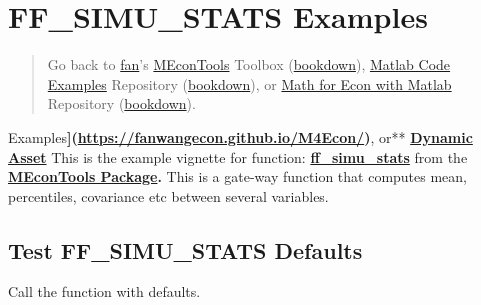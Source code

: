 \documentclass[
]{book}
\begin{document}
\hypertarget{ff_simu_stats-examples}{%
\section{FF\_SIMU\_STATS Examples}\label{ff_simu_stats-examples}}

\begin{quote}
Go back to \href{http://fanwangecon.github.io/}{fan}'s \href{https://fanwangecon.github.io/MEconTools/}{MEconTools} Toolbox (\href{https://fanwangecon.github.io/MEconTools/bookdown}{bookdown}), \href{https://fanwangecon.github.io/M4Econ/}{Matlab Code Examples} Repository (\href{https://fanwangecon.github.io/M4Econ/bookdown}{bookdown}), or \href{https://fanwangecon.github.io/Math4Econ/}{Math for Econ with Matlab} Repository (\href{https://fanwangecon.github.io/Math4Econ/bookdown}{bookdown}).
\end{quote}

Examples\textbf{{]}(\url{https://fanwangecon.github.io/M4Econ/})}, or** \href{https://fanwangecon.github.io/CodeDynaAsset/}{\textbf{Dynamic
Asset}}
This is the example vignette for function:
\href{https://github.com/FanWangEcon/MEconTools/blob/master/MEconTools/stats/ff_simu_stats.m}{\textbf{ff\_simu\_stats}}
from the \href{https://fanwangecon.github.io/MEconTools/}{\textbf{MEconTools
Package}}\textbf{.} This is a
gate-way function that computes mean, percentiles, covariance etc
between several variables.

\hypertarget{test-ff_simu_stats-defaults}{%
\subsection{Test FF\_SIMU\_STATS Defaults}\label{test-ff_simu_stats-defaults}}

Call the function with defaults.
\end{document}

